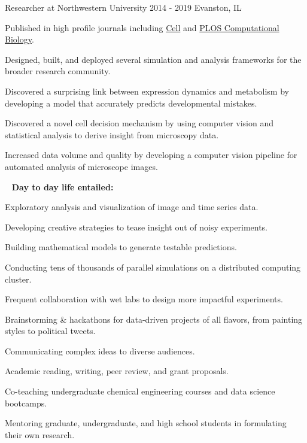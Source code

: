 \begin{cventries}
  \cventrynew
	{Researcher at Northwestern University}    
    {2014 - 2019} 
    {Evanston, IL} 
    { \begin{cvitems}	
		\item {Published in high profile journals including \href{https://doi.org/10.1016/j.cell.2019.06.023}{Cell} and \href{https://doi.org/10.1371/journal.pcbi.1007406}{PLOS Computational Biology}.}
		\item {Designed, built, and deployed several simulation and analysis frameworks for the broader research community.}
		\item {Discovered a surprising link between expression dynamics and metabolism by developing a model that accurately predicts developmental mistakes.}
		\item {Discovered a novel cell decision mechanism by using computer vision and statistical analysis to derive insight from microscopy data.}
		\item {Increased data volume and quality by developing a computer vision pipeline for automated analysis of microscope images.}		
	  \end{cvitems}
     \vspace{6.0mm}
    \ \newline 
    \textbf{Day to day life entailed:}
    \vspace{4.0mm}
     \begin{cvitems}
     	\item {Exploratory analysis and visualization of image and time series data.}     	
     	\item {Developing creative strategies to tease insight out of noisy experiments.}   	
     	\item {Building mathematical models to generate testable predictions.}
		\item {Conducting tens of thousands of parallel simulations on a distributed computing cluster.}
		\item {Frequent collaboration with wet labs to design more impactful experiments.}		 
		\item {Brainstorming \& hackathons for data-driven projects of all flavors, from painting styles to political tweets.}
		\item {Communicating complex ideas to diverse audiences.}
		\item {Academic reading, writing, peer review, and grant proposals.}
        \item {Co-teaching undergraduate chemical engineering courses and data science bootcamps.}
        \item {Mentoring graduate, undergraduate, and high school students in formulating their own research.}         
      \end{cvitems}
     }
     

\end{cventries}
